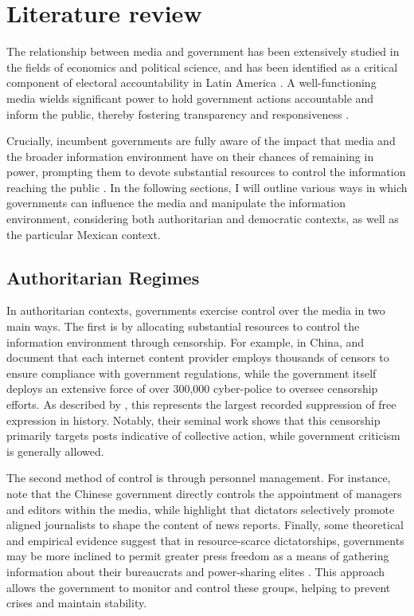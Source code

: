\section{Literature review}
\label{sec:lit_review}

The relationship between media and government has been extensively studied in the fields of economics and political science, and has been identified as a critical component of electoral accountability in Latin America \citep{Audits-Ferraz-QJE, PolInfo-Enriquez-JEEA, Marshall}. A well-functioning media wields significant power to hold government actions accountable and inform the public, thereby fostering transparency and responsiveness \citep{Stromberg-MediaCoverage, Account-Boix-JoLEO}. 

Crucially, incumbent governments are fully aware of the impact that media and the broader information environment have on their chances of remaining in power, prompting them to devote substantial resources to control the information reaching the public \citep{Autocracy-Guriev-JPE}. In the following sections, I will outline various ways in which governments can influence the media and manipulate the information environment, considering both authoritarian and democratic contexts, as well as the particular Mexican context.

\subsection{Authoritarian Regimes}

In authoritarian contexts, governments exercise control over the media in two main ways. The first is by allocating substantial resources to control the information environment through censorship. For example, in China, \cite{Army-Chen-Book} and \citep{CensorshipCollective-King-APSR} document that each internet content provider employs thousands of censors to ensure compliance with government regulations, while the government itself deploys an extensive force of over 300,000 cyber-police to oversee censorship efforts. As described by \cite{CensorshipChina-King-Science}, this represents the largest recorded suppression of free expression in history. Notably, their seminal work shows that this censorship primarily targets posts indicative of collective action, while government criticism is generally allowed.

The second method of control is through personnel management. For instance, \cite{Plus-Anne-PostComm} note that the Chinese government directly controls the appointment of managers and editors within the media, while \cite{PersonnelMedia-Lee-IntJPPoli} highlight that dictators selectively promote aligned journalists to shape the content of news reports. Finally, some theoretical and empirical evidence suggest that in resource-scarce dictatorships, governments may be more inclined to permit greater press freedom as a means of gathering information about their bureaucrats \citep{PoorDict-Guriev-APSR} and power-sharing elites \citep{ElitesMedia-Tung-PolComm}. This approach allows the government to monitor and control these groups, helping to prevent crises and maintain stability.

